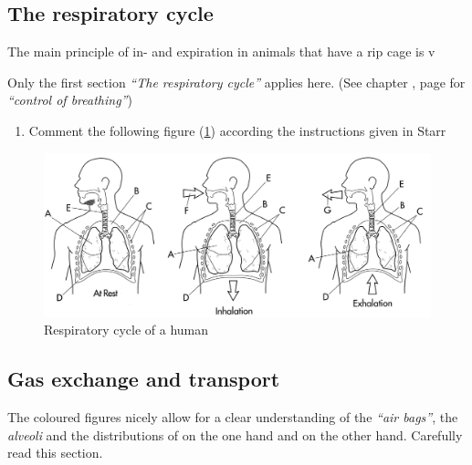 \subsection{The respiratory cycle}
The main principle of in- and expiration in animals that have a rip cage is v

		\begin{mdframed}[style=exampledefault, userdefinedwidth=12cm,frametitle={Starr, chapter 35.5}\label{mat:BEISPIELMATERIAL}]
			Only the first section \textit{``The respiratory cycle''} applies here. (See chapter , page \pageref{sec:HomeostaticControl} for \textit{``control of breathing''})
		\end{mdframed}

	\begin{enumerate}[resume, leftmargin=*]
	\item  Comment the following figure (\ref{fig:RespiratoryCycle}) according the instructions given in  Starr
	\end{enumerate}



		 		\begin{figure}[htp]
		  \includegraphics[width=12cm]{../images/BiolColBook-265-fig1.png}
		  \caption[Respiratory cycle; Biology Coloring Book p. 265]{Respiratory cycle of a human}
		  \label{fig:RespiratoryCycle}
		\end{figure}


\clearpage
\subsection{Gas exchange and transport}


		\begin{mdframed}[style=exampledefault, userdefinedwidth=11.5cm,frametitle={Starr chapter 35.6}\label{mat:BEISPIELMATERIAL}]
			The coloured figures nicely allow for a clear understanding of the \textit{``air bags''}, the \emph{alveoli} and the distributions of   on the one hand and   on the other hand. Carefully read this section.
		\end{mdframed}

